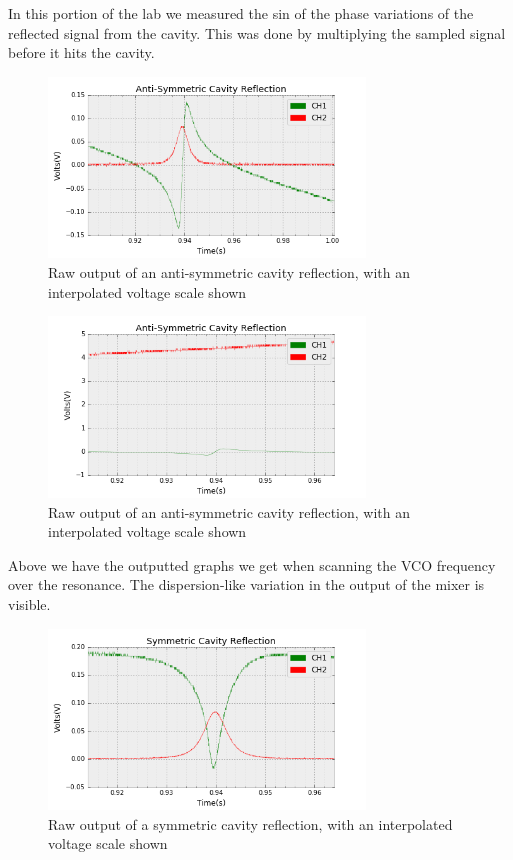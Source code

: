 In this portion of the lab we measured the sin of the phase variations of the reflected signal from the cavity. This was done by multiplying the sampled signal before it hits the cavity. 


\begin{figure}[H]
\centering
\includegraphics[width=0.75\textwidth]{figures/PartC/scope_12_raw.png}
\caption{Raw output of an anti-symmetric cavity reflection, with an interpolated voltage scale shown}
\label{fig:scope12_raw}
\end{figure}

\begin{figure}[H]
\centering
\includegraphics[width=0.75\textwidth]{figures/PartC/scope_14_raw.png}
\caption{Raw output of an anti-symmetric cavity reflection, with an interpolated voltage scale shown}
\label{fig:scope14_raw}
\end{figure}

Above we have the outputted graphs we get when scanning the VCO frequency over the resonance. The dispersion-like variation in the output of the mixer is visible.
\begin{figure}[H]
\centering
\includegraphics[width=0.75\textwidth]{figures/PartC/scope_15_raw.png}
\caption{Raw output of a symmetric cavity reflection, with an interpolated voltage scale shown}
\label{fig:scope15_raw}
\end{figure}

